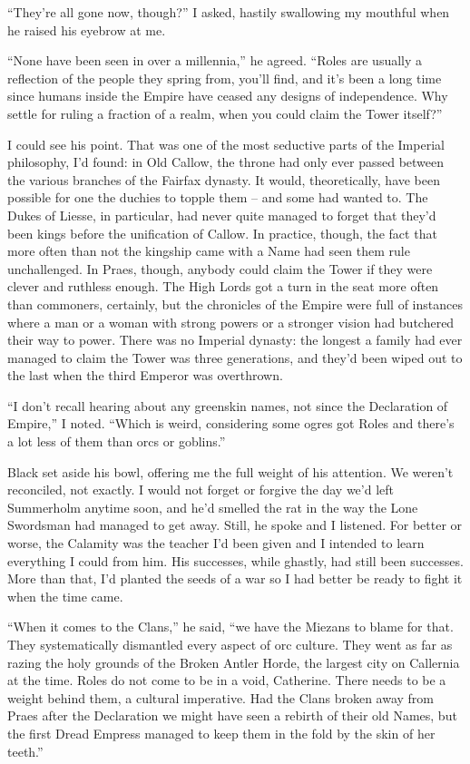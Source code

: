 \documentclass[12pt, openany]{book}
\begin{document}
“They’re all gone now, though?” I asked, hastily swallowing my mouthful when he raised his eyebrow at me.

“None have been seen in over a millennia,” he agreed. “Roles are usually a reflection of the people they spring from, you’ll find, and it’s been a long time since humans inside the Empire have ceased any designs of independence. Why settle for ruling a fraction of a realm, when you could claim the Tower itself?”

I could see his point. That was one of the most seductive parts of the Imperial philosophy, I’d found: in Old Callow, the throne had only ever passed between the various branches of the Fairfax dynasty. It would, theoretically, have been possible for one the duchies to topple them – and some had wanted to. The Dukes of Liesse, in particular, had never quite managed to forget that they’d been kings before the unification of Callow. In practice, though, the fact that more often than not the kingship came with a Name had seen them rule unchallenged. In Praes, though, anybody could claim the Tower if they were clever and ruthless enough. The High Lords got a turn in the seat more often than commoners, certainly, but the chronicles of the Empire were full of instances where a man or a woman with strong powers or a stronger vision had butchered their way to power. There was no Imperial dynasty: the longest a family had ever managed to claim the Tower was three generations, and they’d been wiped out to the last when the third Emperor was overthrown.

“I don’t recall hearing about any greenskin names, not since the Declaration of Empire,” I noted. “Which is weird, considering some ogres got Roles and there’s a lot less of them than orcs or goblins.”

Black set aside his bowl, offering me the full weight of his attention. We weren’t reconciled, not exactly. I would not forget or forgive the day we’d left Summerholm anytime soon, and he’d smelled the rat in the way the Lone Swordsman had managed to get away. Still, he spoke and I listened. For better or worse, the Calamity was the teacher I’d been given and I intended to learn everything I could from him. His successes, while ghastly, had still been successes. More than that, I’d planted the seeds of a war so I had better be ready to fight it when the time came.

“When it comes to the Clans,” he said, “we have the Miezans to blame for that. They systematically dismantled every aspect of orc culture. They went as far as razing the holy grounds of the Broken Antler Horde, the largest city on Callernia at the time. Roles do not come to be in a void, Catherine. There needs to be a weight behind them, a cultural imperative. Had the Clans broken away from Praes after the Declaration we might have seen a rebirth of their old Names, but the first Dread Empress managed to keep them in the fold by the skin of her teeth.”
\end{document}
